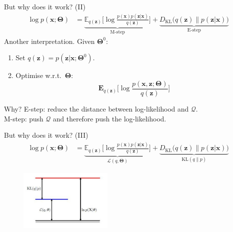 \documentclass{beamer}
\newcommand{\bs}[1]{\boldsymbol{#1}}
\begin{document}
\begin{frame}{But why does it work? (II)}
 \begin{align*}
\log p(\bs{x};\bs{\Theta}) &= \underbrace{\mathbb{E}_{q(\bs{z})}\Big[\log \frac{p(\bs{x})p(\bs{z}|\bs{x})}{q(\bs{z})}\Big]}_{\text{M-step}} +  \underbrace{D_{\text{KL}}\Big(q(\bs{z})\Big\lVert p(\bs{z}|\bs{x})\Big)}_{\text{E-step}}
\end{align*}
Another interpretation. Given $\bs{\Theta}^0$:
\begin{enumerate}
 \item Set $q(\bs{z})=p(\bs{z}|\bs{x};\bs{\Theta}^0)$.
 \item Optimise w.r.t.\ $\bs{\Theta}$:\vspace{-3mm}
 \[ \mathbf{E}_{q(\bs{z})} \Big[\log \frac{p(\bs{x},\bs{z};\bs{\Theta})}{q(\bs{z})}\Big] \]
\end{enumerate}
\begin{block}{Why?}
  E-step: reduce the distance between log-likelihood and $\mathcal{Q}$.\\
  M-step: push $\mathcal{Q}$ and therefore push the log-likelihood.
\end{block}
\end{frame}

\begin{frame}{But why does it work? (III)}
\begin{align*}
\log p(\bs{x};\bs{\Theta}) &= \underbrace{\mathbb{E}_{q(\bs{z})}\Big[\log \frac{p(\bs{x})p(\bs{z}|\bs{x})}{q(\bs{z})}\Big]}_{ \mathcal{L}(q,\bs{\Theta}) } +  \underbrace{D_{\text{KL}}\Big(q(\bs{z})\Big\lVert p(\bs{z}|\bs{x})\Big)}_{\textrm{KL}(q\lVert p)}
\end{align*}
 
\begin{figure}
 \centering
 \includegraphics[width=0.4\textwidth]{fig/em-gap.jpg}
\end{figure}

\end{frame}
\end{document}
